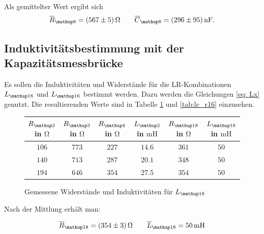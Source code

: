 Als gemittelter Wert ergibt sich
\begin{equation}
\label{eq:wert_r8_c_8}
\overline{R}_{\map{8}}=\SI{567\pm5}{\ohm} \qquad \overline{C}_{\map{8}}=\SI{296\pm95}{\nano\farad}.
\end{equation}

\subsection{Induktivitätsbestimmung mit der Kapazitätsmessbrücke}

Es sollen die Induktivitäten und Widerstände für die LR-Kombinationen $L\ua{18}$ und
$L\ua{16}$ bestimmt werden. Dazu werden die Gleichungen \eqref{eq: Lx} genutzt.
Die resultierenden Werte sind in Tabelle \ref{tab:lc_r18} und \ref{tab:lc_r16} einzusehen. %

\begin{figure}
\centering
\caption{Gemessene Widerstände und Induktivitäten für $L\ua{18}$}
  \label{tab:lc_r18}
\begin{tabular}{S S S S S S }
    \toprule
    {$R\ua{2}$ in $\si{\ohm}$} &  {$R\ua{3}$ in $\si{\ohm}$} & {$R\ua{4}$ in $\si{\ohm}$} & {$L\ua{2}$ in $\si{\milli\henry}$}& {$R\ua{18}$ in $\si{\ohm}$} &  {$L\ua{18}$ in $\si{\milli\henry}$} \\
    \midrule
     {$\num{106}$} & {$\num{773}$} &  {$\num{227}$}& {$\num{14,6}$}  &  {$\num{361}$} & {$\num{50}$}\\
     {$\num{140}$} & {$\num{713}$}  & {$\num{287}$} & {$\num{20,1}$} & {$\num{348}$} & {$\num{50}$}\\
     {$\num{194}$} & {$\num{646}$}  & {$\num{354}$} & {$\num{27,5}$} &{$\num{354}$} & {$\num{50}$}  \\
    \bottomrule
  \end{tabular}
 \end{figure}
Nach der Mittlung erhält man:

\begin{equation}
\label{eq:wert_r18_l_18}
\overline{R}_{\map{18}}=\SI{354\pm3}{\ohm} \qquad \overline{L}_{\map{18}}=\SI{50}{\milli\henry}
\end{equation}

